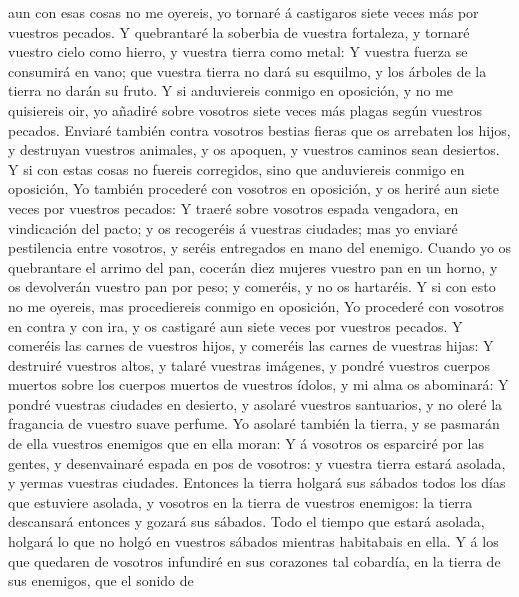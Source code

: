 aun con esas cosas no me oyereis, yo tornaré á castigaros siete veces
más por vuestros pecados.  Y quebrantaré la soberbia de
vuestra fortaleza, y tornaré vuestro cielo como hierro, y vuestra tierra
como metal:  Y vuestra fuerza se consumirá en vano; que
vuestra tierra no dará su esquilmo, y los árboles de la tierra no darán
su fruto.  Y si anduviereis conmigo en oposición, y no me
quisiereis oir, yo añadiré sobre vosotros siete veces más plagas según
vuestros pecados.  Enviaré también contra vosotros
bestias fieras que os arrebaten los hijos, y destruyan vuestros
animales, y os apoquen, y vuestros caminos sean desiertos.
 Y si con estas cosas no fuereis corregidos, sino que
anduviereis conmigo en oposición,  Yo también procederé
con vosotros en oposición, y os heriré aun siete veces por vuestros
pecados:  Y traeré sobre vosotros espada vengadora, en
vindicación del pacto; y os recogeréis á vuestras ciudades; mas yo
enviaré pestilencia entre vosotros, y seréis entregados en mano del
enemigo.  Cuando yo os quebrantare el arrimo del pan,
cocerán diez mujeres vuestro pan en un horno, y os devolverán vuestro
pan por peso; y comeréis, y no os hartaréis.  Y si con
esto no me oyereis, mas procediereis conmigo en oposición,
 Yo procederé con vosotros en contra y con ira, y os
castigaré aun siete veces por vuestros pecados.  Y
comeréis las carnes de vuestros hijos, y comeréis las carnes de vuestras
hijas:  Y destruiré vuestros altos, y talaré vuestras
imágenes, y pondré vuestros cuerpos muertos sobre los cuerpos muertos de
vuestros ídolos, y mi alma os abominará:  Y pondré
vuestras ciudades en desierto, y asolaré vuestros santuarios, y no oleré
la fragancia de vuestro suave perfume.  Yo asolaré
también la tierra, y se pasmarán de ella vuestros enemigos que en ella
moran:  Y á vosotros os esparciré por las gentes, y
desenvainaré espada en pos de vosotros: y vuestra tierra estará asolada,
y yermas vuestras ciudades.  Entonces la tierra holgará
sus sábados todos los días que estuviere asolada, y vosotros en la
tierra de vuestros enemigos: la tierra descansará entonces y gozará sus
sábados.  Todo el tiempo que estará asolada, holgará lo
que no holgó en vuestros sábados mientras habitabais en ella.
 Y á los que quedaren de vosotros infundiré en sus
corazones tal cobardía, en la tierra de sus enemigos, que el sonido de
